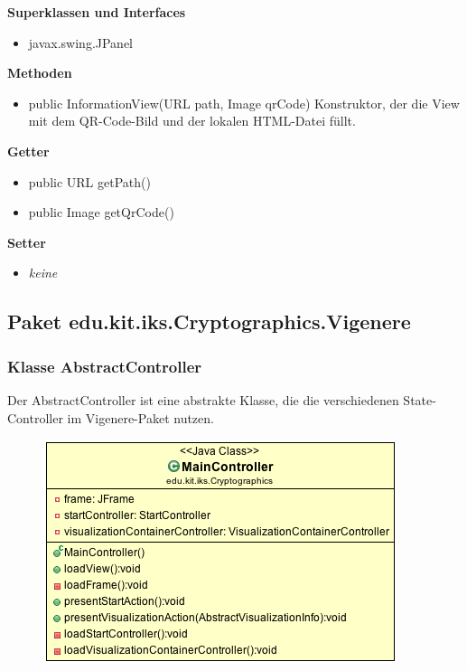 \documentclass{article}
\begin{document}
      \textbf{Superklassen und Interfaces}
      \begin{itemize}
        \item javax.swing.JPanel
      \end{itemize}
	
      \textbf{Methoden}
      \begin{itemize}
        \item public InformationView(URL path, Image qrCode) \newline
          Konstruktor, der die View mit dem QR-Code-Bild und der lokalen HTML-Datei füllt.
      \end{itemize}
      
      \textbf{Getter}
      \begin{itemize}
		\item public URL getPath()
		\item public Image getQrCode()
      \end{itemize}
      
      \textbf{Setter}
      \begin{itemize}
        \item \textit{keine}
      \end{itemize}
	
  \subsection{Paket edu.kit.iks.Cryptographics.Vigenere}
    \subsubsection{Klasse AbstractController}
      Der AbstractController ist eine abstrakte Klasse, die die verschiedenen State-Controller im Vigenere-Paket nutzen.
      \begin{figure}[H]
        \centering
        \includegraphics[width=\textwidth]{resources/edu-kit-iks-Cryptographics-MainController}
      \end{figure}
\end{document}
